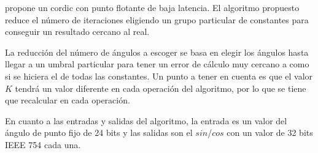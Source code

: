 \begin{table}[]
	\centering
	\caption{Resultados de 64FP \gls{cordic} y una CPU AMD Athlon 64 Processor 3200+. Num\_C es el número de co-procesadores de \gls{cordic} usados en el experimento.}
	\label{table:2008_64FP_results_AMD}
\end{table}

\cite{nguyen_low-resource_2015} propone un \gls{cordic} con punto flotante de baja latencia. El algoritmo propuesto reduce el número de iteraciones eligiendo un grupo particular de constantes para conseguir un resultado cercano al real.

La reducción del número de ángulos a escoger se basa en elegir los ángulos hasta llegar a un umbral particular para tener un error de cálculo muy cercano a como si se hiciera el de todas las constantes. Un punto a tener en cuenta es que el valor $K$ tendrá un valor diferente en cada operación del algoritmo, por lo que se tiene que recalcular en cada operación.

En cuanto a las entradas y salidas del algoritmo, la entrada es un valor del ángulo de punto fijo de 24 bits y las salidas son el $sin$/$cos$ con un valor de 32 bits IEEE 754 cada una.


